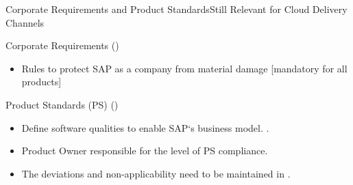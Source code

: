\begin{frame}{Corporate Requirements and Product Standards}{Still Relevant for Cloud Delivery Channels}
\begin{block}{Corporate Requirements ()}
	\begin{itemize}
		\item Rules to protect SAP as a company from material damage [mandatory for all products]
	\end{itemize}
\end{block}

\begin{block}{Product Standards (PS) ()} 
	\begin{itemize}
		\item Define software qualities to enable SAP‘s business model. 
		. 
		\item Product Owner responsible for the level of PS compliance.  
		\item The deviations and non-applicability need to be maintained in . 
	\end{itemize}
\end{block}
\end{frame}

